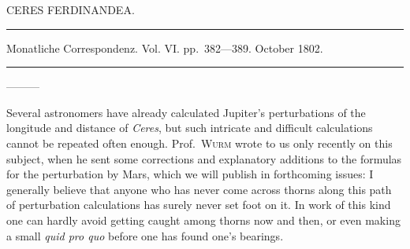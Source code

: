\bigskip{}
\begin{center}
CERES FERDINANDEA.\par
\medskip\hrule\medskip
Monatliche Correspondenz. Vol. VI. pp.\ 382—389. October 1802.\par
\medskip\hrule
\end{center}\medskip
—\quad —\quad —

Several astronomers have already calculated Jupiter’s perturbations of the longitude and distance of \textit{Ceres}, but such intricate and difficult calculations cannot be repeated often enough. Prof.\ \textsc{Wurm} wrote to us only recently on this subject, when he sent some corrections and explanatory additions to the formulas for the
\newcommand{\JupiterSymbol}{\text{\mdseries\AstroSymbols ♃}}
%
perturbation by Mars, which we will publish in forthcoming issues: I generally believe that anyone who has never come across thorns along this path of perturbation calculations has surely never set foot on it. In work of this kind one can hardly avoid getting caught among thorns now and then, or even making a small \textit{quid pro quo} before one has found one’s bearings.

